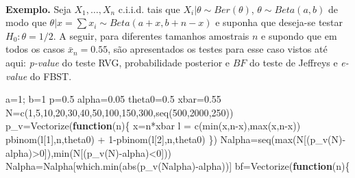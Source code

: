 \documentclass[
]{book}
\newenvironment{Shaded}{\begin{snugshade}}{\end{snugshade}}
\newcommand{\ControlFlowTok}[1]{\textcolor[rgb]{0.13,0.29,0.53}{\textbf{#1}}}
\newcommand{\DecValTok}[1]{\textcolor[rgb]{0.00,0.00,0.81}{#1}}
\newcommand{\FloatTok}[1]{\textcolor[rgb]{0.00,0.00,0.81}{#1}}
\newcommand{\FunctionTok}[1]{\textcolor[rgb]{0.00,0.00,0.00}{#1}}
\newcommand{\NormalTok}[1]{#1}
\newcommand{\OtherTok}[1]{\textcolor[rgb]{0.56,0.35,0.01}{#1}}
\newcommand{\SpecialCharTok}[1]{\textcolor[rgb]{0.00,0.00,0.00}{#1}}
\begin{document}
\(~\)

\textbf{Exemplo.} Seja \(X_1,\ldots,X_n\) c.i.i.d. tais que \(X_i|\theta \sim Ber(\theta)\), \(\theta \sim Beta(a,b)\) de modo que \(\theta|x=\sum x_i \sim Beta(a+x,b+n-x)\) e suponha que deseja-se testar \(H_0: \theta= 1/2\). A seguir, para diferentes tamanhos amostrais \(n\) e supondo que em todos os casos \(\bar{x}_n=0.55\), são apresentados os testes para esse caso vistos até aqui: \emph{p-value} do teste RVG, probabilidade posterior e \(BF\) do teste de Jeffreys e \emph{e-value} do FBST.

\begin{Shaded}
\begin{Highlighting}[]
\NormalTok{a}\OtherTok{=}\DecValTok{1}\NormalTok{; b}\OtherTok{=}\DecValTok{1}
\NormalTok{p}\OtherTok{=}\FloatTok{0.5}
\NormalTok{alpha}\OtherTok{=}\FloatTok{0.05}
\NormalTok{theta0}\OtherTok{=}\FloatTok{0.5}
\NormalTok{xbar}\OtherTok{=}\FloatTok{0.55}
\NormalTok{N}\OtherTok{=}\FunctionTok{c}\NormalTok{(}\DecValTok{1}\NormalTok{,}\DecValTok{5}\NormalTok{,}\DecValTok{10}\NormalTok{,}\DecValTok{20}\NormalTok{,}\DecValTok{30}\NormalTok{,}\DecValTok{40}\NormalTok{,}\DecValTok{50}\NormalTok{,}\DecValTok{100}\NormalTok{,}\DecValTok{150}\NormalTok{,}\DecValTok{300}\NormalTok{,}\FunctionTok{seq}\NormalTok{(}\DecValTok{500}\NormalTok{,}\DecValTok{2000}\NormalTok{,}\DecValTok{250}\NormalTok{))}
\NormalTok{p\_v}\OtherTok{=}\FunctionTok{Vectorize}\NormalTok{(}\ControlFlowTok{function}\NormalTok{(n)\{}
\NormalTok{  x}\OtherTok{=}\NormalTok{n}\SpecialCharTok{*}\NormalTok{xbar}
\NormalTok{  l }\OtherTok{=} \FunctionTok{c}\NormalTok{(}\FunctionTok{min}\NormalTok{(x,n}\SpecialCharTok{{-}}\NormalTok{x),}\FunctionTok{max}\NormalTok{(x,n}\SpecialCharTok{{-}}\NormalTok{x))}
  \FunctionTok{pbinom}\NormalTok{(l[}\DecValTok{1}\NormalTok{],n,theta0) }\SpecialCharTok{+} \DecValTok{1}\SpecialCharTok{{-}}\FunctionTok{pbinom}\NormalTok{(l[}\DecValTok{2}\NormalTok{],n,theta0) \})}
\NormalTok{Nalpha}\OtherTok{=}\FunctionTok{seq}\NormalTok{(}\FunctionTok{max}\NormalTok{(N[(}\FunctionTok{p\_v}\NormalTok{(N)}\SpecialCharTok{{-}}\NormalTok{alpha)}\SpecialCharTok{\textgreater{}}\DecValTok{0}\NormalTok{]),}\FunctionTok{min}\NormalTok{(N[(}\FunctionTok{p\_v}\NormalTok{(N)}\SpecialCharTok{{-}}\NormalTok{alpha)}\SpecialCharTok{\textless{}}\DecValTok{0}\NormalTok{]))}
\NormalTok{Nalpha}\OtherTok{=}\NormalTok{Nalpha[}\FunctionTok{which.min}\NormalTok{(}\FunctionTok{abs}\NormalTok{(}\FunctionTok{p\_v}\NormalTok{(Nalpha)}\SpecialCharTok{{-}}\NormalTok{alpha))]}
\NormalTok{bf}\OtherTok{=}\FunctionTok{Vectorize}\NormalTok{(}\ControlFlowTok{function}\NormalTok{(n)\{}

\end{Highlighting}
\end{Shaded}
\end{document}
